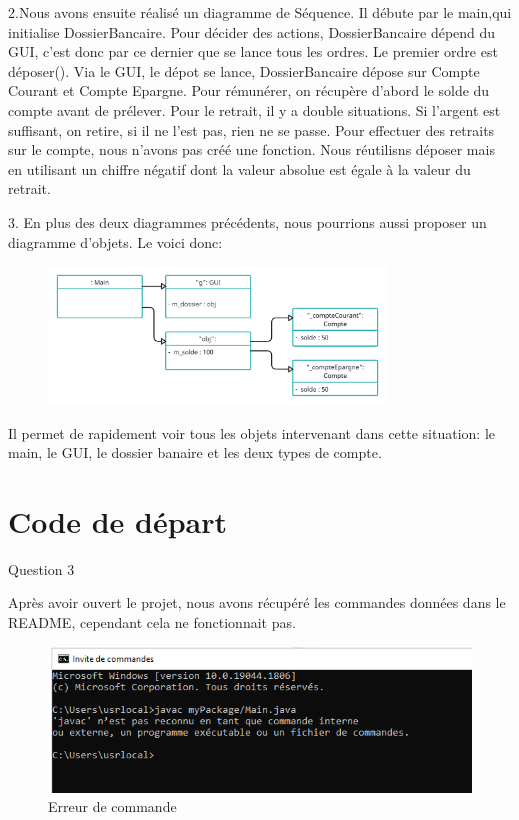 \documentclass{article}
\begin{document}
2.Nous avons ensuite réalisé un diagramme de Séquence. Il débute par le main,qui initialise DossierBancaire. Pour décider des actions, DossierBancaire dépend du GUI, c'est donc par ce dernier que se lance tous les ordres.
Le premier ordre est déposer(). Via le GUI, le dépot se lance, DossierBancaire dépose sur Compte Courant et Compte Epargne.
Pour rémunérer, on récupère d'abord le solde du compte avant de prélever.
Pour le retrait, il y a double situations. Si l'argent est suffisant, on retire, si il ne l'est pas, rien ne se passe.
Pour effectuer des retraits sur le compte, nous n'avons pas créé une fonction. Nous réutilisns déposer mais en utilisant un chiffre négatif dont la valeur absolue est égale à la valeur du retrait.

3. En plus des deux diagrammes précédents, nous pourrions aussi proposer un diagramme d'objets. Le voici donc:



\begin{figure}[h]
\includegraphics[width=0.8\textwidth]{diagrammeObj.png}
\end{figure}

Il permet de rapidement voir tous les objets intervenant dans cette situation: le main, le GUI, le dossier banaire et les deux types de compte.


\newpage
\section{Code de départ}


Question 3
\newline


Après avoir ouvert le projet, nous avons récupéré les commandes données dans le README, cependant cela ne fonctionnait pas.
\newline

\begin{figure}[h]

\includegraphics[width=1\textwidth]{erreurjavac.png}
\caption{Erreur de commande}
\end{figure}
\end{document}
